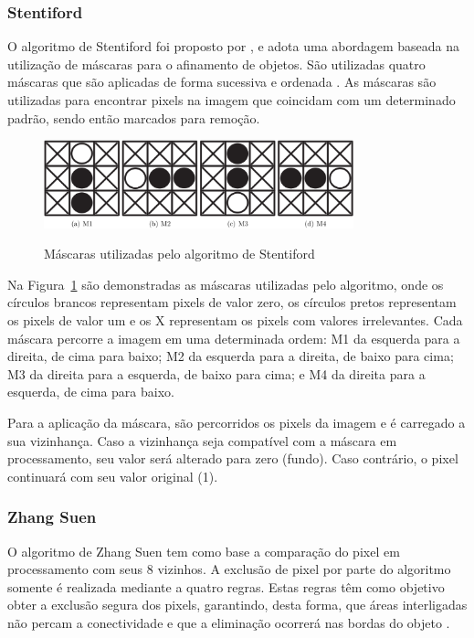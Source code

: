 \documentclass[12pt,oneside,a4paper,english,french,spanish,brazil,]{abntex2}
\begin{document}
\subsubsection{Stentiford}

O algoritmo de Stentiford foi proposto por \citet{stentiford:1983}, e adota uma abordagem baseada na utilização de máscaras para o afinamento de objetos. São utilizadas quatro máscaras que são aplicadas de forma sucessiva e ordenada \cite{guilherme:2007}. As máscaras são utilizadas para encontrar pixels na imagem que coincidam com um determinado padrão, sendo então marcados para remoção.

\begin{figure}[ht]
\centering
\caption{Máscaras utilizadas pelo algoritmo de Stentiford}
\includegraphics[width=0.8\textwidth]{imagens/PDI_Stentiford_1.PNG}
\label{fig:PDI_Stentiford_1}
\end{figure}

Na Figura~\ref{fig:PDI_Stentiford_1} são demonstradas as máscaras utilizadas pelo algoritmo, onde os círculos brancos representam pixels de valor zero, os círculos pretos representam os pixels de valor um e os X representam os pixels com valores irrelevantes. Cada máscara percorre a imagem em uma determinada ordem: M1 da esquerda para a direita, de cima para baixo; M2 da esquerda para a direita, de baixo para cima; M3 da direita para a esquerda, de baixo para cima; e M4 da direita para a esquerda, de cima para baixo.

Para a aplicação da máscara, são percorridos os pixels da imagem e é carregado a sua vizinhança. Caso a vizinhança seja compatível com a máscara em processamento, seu valor será alterado para zero (fundo). Caso contrário, o pixel continuará com seu valor original (1).

\subsubsection{Zhang Suen}

O algoritmo de Zhang Suen \cite{zhang:1984} tem como base a comparação do pixel em processamento com seus 8 vizinhos. A exclusão de pixel por parte do algoritmo somente é realizada mediante a quatro regras. Estas regras têm como objetivo obter a exclusão segura dos pixels, garantindo, desta forma, que áreas interligadas não percam a conectividade e que a eliminação ocorrerá nas bordas do objeto \cite{guilherme:2007}.
\end{document}
